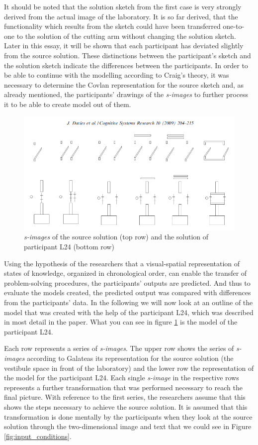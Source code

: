 \documentclass[12pt]{article}
\begin{document}
It should be noted that the solution sketch from the first case is very strongly derived from the actual image of the laboratory. It is so far derived, that the functionality which results from the sketch could have been transferred one-to-one to the solution of the cutting arm without changing the solution sketch. Later in this essay, it will be shown that each participant has deviated slightly from the source solution. These distinctions between the participant's sketch and the solution sketch indicate the differences between the participants. In order to be able to continue with the modelling according to Craig's theory, it was necessary to determine the Covlan representation for the source sketch and, as already mentioned, the participants' drawings of the  \textit{s-images} to further process it to be able to create model out of them. 

\begin{figure}[H]
  \centering
  \includegraphics[width=0.7\linewidth]{images/covlan_L24.PNG}
  \caption{\label{fig:covlan_l24}\textit{s-images} of the source solution (top row) and the solution of participant L24 (bottom row)}
\end{figure}  

Using the hypothesis of the researchers that a visual-spatial representation of states of knowledge, organized in chronological order, can enable the transfer of problem-solving procedures, the participants' outputs are predicted. And thus to evaluate the models created, the predicted output was compared with differences from the participants' data. In the following we will now look at an outline of the model that was created with the help of the participant L24, which was described in most detail in the paper.  What you can see in figure \ref{fig:covlan_l24} is the model of the participant L24. 

Each row represents a series of \textit{s-images}. The upper row shows the series of \textit{s-images} according to Galateas its representation for the source solution (the vestibule space in front of the laboratory) and the lower row the representation of the model for the participant L24. Each single \textit{s-image} in the respective rows represents a further transformation that was performed necessary to reach the final picture. With reference to the first series, the researchers assume that this shows the steps necessary to achieve the source solution. It is assumed that this transformation is done mentally by the participants when they look at the source solution through the two-dimensional image and text that we could see in Figure \ref{fig:input_conditions}. 
\end{document}
